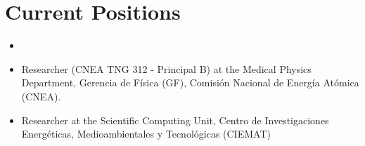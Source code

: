 \ifeng
\section*{Current Positions}
\begin{itemize}
    \item \item {} Researcher (CNEA TNG 312 - Principal B) at the Medical Physics Department, Gerencia de Física (GF), Comisión Nacional de Energía Atómica (CNEA).
    \item {} Researcher at the Scientific Computing Unit, Centro de Investigaciones Energéticas, Medioambientales y Tecnológicas (CIEMAT)

\end{itemize}
\else
